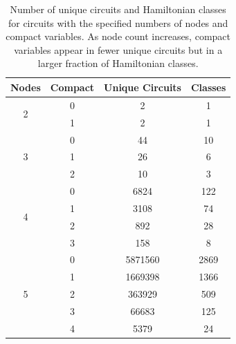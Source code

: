 \begin{table}[htbp]
\setlength{\tabcolsep}{11pt}
\centering
\begin{tabular}{cccc}
\toprule
Nodes & Compact & Unique Circuits & Classes \\ \toprule
\multirow{2}{*}{2}& 0 & 2 & 1 \\
& 1 & 2 & 1 \\
\midrule
\multirow{3}{*}{3}& 0 & 44 & 10 \\
& 1 & 26 & 6 \\
& 2 & 10 & 3 \\
\midrule
\multirow{4}{*}{4}& 0 & 6824 & 122 \\
& 1 & 3108 & 74 \\
& 2 & 892 & 28 \\
& 3 & 158 & 8 \\
\midrule
\multirow{5}{*}{5}& 0 & 5871560 & 2869 \\
& 1 & 1669398 & 1366 \\
& 2 & 363929 & 509 \\
& 3 & 66683 & 125 \\
& 4 & 5379 & 24 \\
\bottomrule
\end{tabular}
\caption{Number of unique circuits and Hamiltonian classes for circuits with the specified numbers of nodes and compact variables. As node count increases, compact variables appear in fewer unique circuits but in a larger fraction of Hamiltonian classes.}
    \label{tab:stats_periodic}
\end{table}

